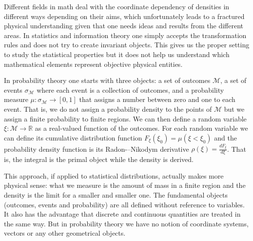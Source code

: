 \documentclass[11pt]{article}
\begin{document}
Different fields in math deal with the coordinate dependency of densities in different ways depending on their aims, which unfortunately leads to a fractured physical understanding given that one needs ideas and results from the different areas. In statistics and information theory one simply accepts the transformation rules and does not try to create invariant objects. This gives us the proper setting to study the statistical properties but it does not help us understand which mathematical elements represent objective physical entities.

In probability theory one starts with three objects: a set of outcomes $\mathcal{M}$, a set of events $\sigma_\mathcal{M}$ where each event is a collection of outcomes, and a probability measure $\mu : \sigma_\mathcal{M} \rightarrow [0,1]$ that assigns a number between zero and one to each event. That is, we do not assign a probability density to the points of $\mathcal{M}$ but we assign a finite probability to finite regions. We can then define a random variable $\xi : \mathcal{M} \rightarrow \mathbb{R}$ as a real-valued function of the outcomes. For each random variable we can define its cumulative distribution function $F_\xi(\xi_0)=\mu(\xi<\xi_0)$ and the probability density function is its Radon-–Nikodym derivative $\rho(\xi) = \frac{dF_\xi}{d\xi}$. That is, the integral is the primal object while the density is derived.

This approach, if applied to statistical distributions, actually makes more physical sense: what we measure is the amount of mass in a finite region and the density is the limit for a smaller and smaller one. The fundamental objects (outcomes, events and probability) are all defined without reference to variables. It also has the advantage that discrete and continuous quantities are treated in the same way. But in probability theory we have no notion of coordinate systems, vectors or any other geometrical objects.
\end{document}
